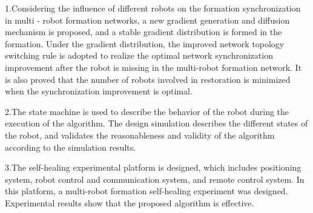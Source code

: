 \begin{englishabstract}
1.Considering the influence of different robots on the formation synchronization in multi - robot formation networks, a new gradient generation and diffusion mechanism is proposed, and a stable gradient distribution is formed in the formation. Under the gradient distribution, the improved network topology switching rule is adopted to realize the optimal network synchronization improvement after the robot is missing in the multi-robot formation network. It is also proved that the number of robots involved in restoration is minimized when the synchronization improvement is optimal.

2.The state machine is used to describe the behavior of the robot during the execution of the algorithm. The design simulation describes the different states of the robot, and validates the reasonableness and validity of the algorithm according to the simulation results.

3.The self-healing experimental platform is designed, which includes positioning system, robot control and communication system, and remote control system. In this platform, a multi-robot formation self-healing experiment was designed. Experimental results show that the proposed algorithm is effective.

\end{englishabstract}

